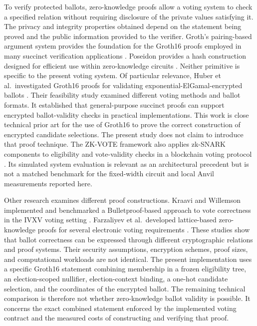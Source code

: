 \label{subsec:related-zero-knowledge}
To verify protected ballots, zero-knowledge proofs allow a voting system to check a specified relation without requiring disclosure of the private values satisfying it. The privacy and integrity properties obtained depend on the statement being proved and the public information provided to the verifier. Groth's pairing-based argument system provides the foundation for the Groth16 proofs employed in many succinct verification applications \citep{groth2016snark}. Poseidon provides a hash construction designed for efficient use within zero-knowledge circuits \citep{grassi2021poseidon}. Neither primitive is specific to the present voting system. Of particular relevance, Huber et al.\ investigated Groth16 proofs for validating exponential-ElGamal-encrypted ballots \citep{huber2025ballotvalidity}. Their feasibility study examined different voting methods and ballot formats. It established that general-purpose succinct proofs can support encrypted ballot-validity checks in practical implementations. This work is close technical prior art for the use of Groth16 to prove the correct construction of encrypted candidate selections. The present study does not claim to introduce that proof technique. The ZK-VOTE framework also applies zk-SNARK components to eligibility and vote-validity checks in a blockchain voting protocol \citep{ismail2025zkvote}. Its simulated system evaluation is relevant as an architectural precedent but is not a matched benchmark for the fixed-width circuit and local Anvil measurements reported here.

Other research examines different proof constructions. Kraavi and Willemson implemented and benchmarked a Bulletproof-based approach to vote correctness in the IVXV voting setting \citep{kraavi2025ivxv}. Farzaliyev et al.\ developed lattice-based zero-knowledge proofs for several electronic voting requirements \citep{farzaliyev2025lattice}. These studies show that ballot correctness can be expressed through different cryptographic relations and proof systems. Their security assumptions, encryption schemes, proof sizes, and computational workloads are not identical. The present implementation uses a specific Groth16 statement combining membership in a frozen eligibility tree, an election-scoped nullifier, election-context binding, a one-hot candidate selection, and the coordinates of the encrypted ballot. The remaining technical comparison is therefore not whether zero-knowledge ballot validity is possible. It concerns the exact combined statement enforced by the implemented voting contract and the measured costs of constructing and verifying that proof.

